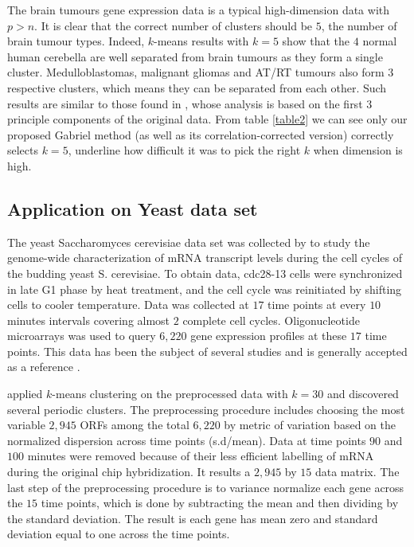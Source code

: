 \documentclass[12pt]{article}
\begin{document}
The brain tumours gene expression data is a typical high-dimension data with $p > n$. It is clear that 
the correct number of clusters should be $5$, the number of brain tumour types. Indeed, $k$-means results with $k=5$ show that the $4$ normal human cerebella are well separated from brain tumours as they form a single cluster.  
Medulloblastomas, malignant gliomas and AT/RT tumours also form $3$ respective clusters, which means they can be separated from each other. Such results are similar to those found in \cite{pomeroy2002prediction}, whose analysis
is based on the first $3$ principle components of the original data.    
From table \ref{table2} we can see only our proposed Gabriel method (as well as its correlation-corrected version) correctly selects $k=5$, underline how difficult it was to pick the right $k$ when dimension is high. 


\subsection{Application on Yeast data set}
The yeast Saccharomyces cerevisiae data set was collected by \cite{cho1998genome} to study the genome-wide characterization of mRNA transcript levels during the cell cycles of the budding yeast S. cerevisiae. To obtain data, 
cdc28-13 cells were synchronized in late G1 phase by heat treatment, and the cell cycle was reinitiated by shifting cells to cooler temperature. Data was collected at $17$ time points at every $10$ minutes intervals covering almost $2$ complete cell cycles. Oligonucleotide microarrays was used to query $6,220$ gene expression profiles at these $17$ time points. This data has been the subject of several studies and is generally accepted as a reference \citep{dortet2008model}.    

\cite{tavazoie1999systematic} applied $k$-means clustering on the preprocessed data with $k=30$ and discovered several periodic clusters. The preprocessing procedure includes choosing the most variable $2,945$ ORFs among the total $6,220$ by metric of variation based on the normalized dispersion across time points (s.d/mean). Data at time points $90$ and $100$ minutes were removed because of their less efficient labelling of mRNA during the original chip hybridization. It results a $2,945$ by $15$ data matrix. The last step of the preprocessing procedure is to variance normalize each gene across the $15$ time points, which is done by subtracting the mean and then dividing by the standard deviation. The result is each gene has mean zero and standard deviation equal to one across the time points.
\end{document}

